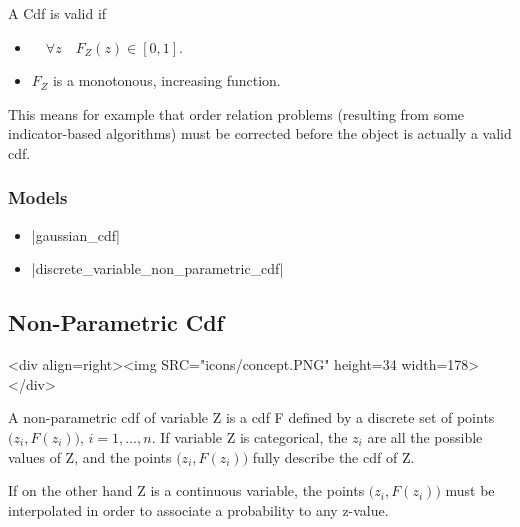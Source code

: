\documentclass[12pt,twoside]{report}
\begin{document}
A Cdf is valid if 
\begin{itemize}
\item $\quad \forall z \quad F_Z(z) \in [0,1]$.
\item $F_Z$ is a monotonous, increasing function.
\end{itemize}
This means for example that order relation problems (resulting from some indicator-based algorithms)  must be corrected before the object is actually a valid cdf. 


\htmlrule[CLEAR=all]  \subsubsection*{Models}
\begin{itemize}
\item |gaussian_cdf|
\item |discrete_variable_non_parametric_cdf|
\end{itemize}








% 
\subsection{Non-Parametric Cdf}
\label{concept:nonparamcdf}
\begin{htmlonly}
<div align=right><img SRC="icons/concept.PNG" height=34 width=178></div>
\end{htmlonly}

A non-parametric cdf of variable Z is a cdf F defined by a discrete set of points \mbox{$\Big( z_i, F(z_i) \Big)$}, $i=1,\ldots,n$. 
If variable Z is categorical, the $z_i$ are all the possible values of Z, and the points \mbox{$\Big( z_i, F(z_i) \Big)$} fully describe the cdf of Z.

If on the other hand Z is a continuous variable, the points  \mbox{$\Big( z_i, F(z_i) \Big)$} must be interpolated in order to associate a probability to any z-value. 
\end{document}
